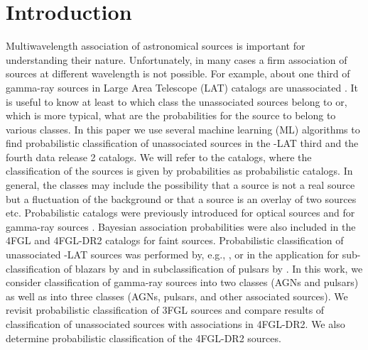 \section{Introduction}

Multiwavelength association of astronomical sources is important for understanding their nature.
Unfortunately, in many cases a firm association of sources at different wavelength is not possible.
For example, about one third of gamma-ray sources in \Fermi Large Area Telescope (LAT) catalogs are unassociated
\citep{2010ApJS..188..405A, 2012ApJS..199...31N, 2015ApJS..218...23A, 2020ApJS..247...33A}.
It is useful to know at least to which class the unassociated sources belong to or, which is more typical,
what are the probabilities for the source to belong to various classes.
In this paper we use several machine learning (ML) algorithms to find probabilistic classification of
unassociated sources in the \Fermi-LAT third \citep[3FGL,][]{2015ApJS..218...23A} and the fourth data release 2
\citep[4FGL-DR2,][]{2020ApJS..247...33A, 2020arXiv200511208B} catalogs.
We will refer to the catalogs, where the classification of the sources is given by probabilities as probabilistic catalogs.
In general, the classes may include the possibility that a source is not a real source but a fluctuation of the background 
or that a source is an overlay of two sources etc.
Probabilistic catalogs
were previously introduced for optical sources 
\citep[e.g.,][]{2010EAS....45..351H, 2013AJ....146....7B}
and for gamma-ray sources \citep{2017ApJ...839....4D}.
Bayesian association probabilities were also included in the 4FGL \citep{2020ApJS..247...33A} and
4FGL-DR2 \citep{2020arXiv200511208B} catalogs for faint sources.
Probabilistic classification of unassociated \Fermi-LAT sources was performed by, e.g.,
\cite{2012ApJ...753...83A, 2016ApJ...820....8S, 2016ApJ...825...69M, 2017A&A...602A..86L, 2020MNRAS.492.5377L, 2020arXiv200106010Z},
or in the application for sub-classification of blazars by
\cite{2013MNRAS.428..220H, 2014ApJ...782...41D, 2016MNRAS.462.3180C, 2017MNRAS.470.1291S, 2019MNRAS.490.4770K, 2020MNRAS.493.1926K}
and in subclassification of pulsars by \cite{2012MNRAS.424.2832L, 2016ApJ...820....8S}.
In this work, we consider classification of gamma-ray sources into two classes (AGNs and pulsars) as well as into three classes 
(AGNs, pulsars, and other associated sources).
We revisit probabilistic classification of 3FGL sources and compare results of classification of unassociated sources
with associations in 4FGL-DR2.
We also determine probabilistic classification of the 4FGL-DR2 sources.


